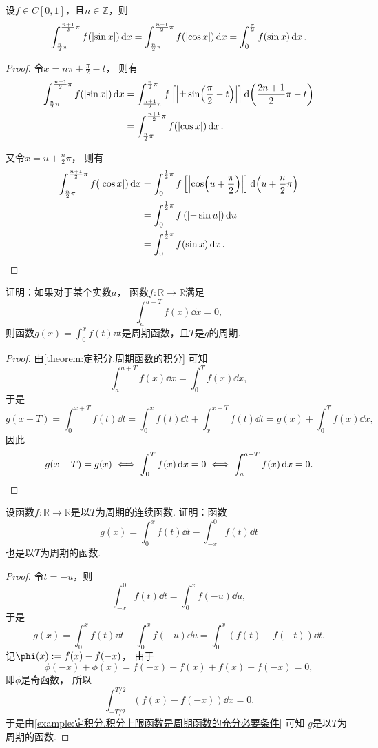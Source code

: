 \begin{proposition}\label{theorem:定积分.正余弦函数的复合的积分2}
设\(f \in C[0,1]\)，且\(n\in\mathbb{Z}\)，则\begin{equation}
	\int_{\frac{n}{2} \pi}^{\frac{n+1}{2} \pi} f(\abs{\sin x}) \dd{x}
	= \int_{\frac{n}{2} \pi}^{\frac{n+1}{2} \pi} f(\abs{\cos x}) \dd{x}
	= \int_0^{\frac{\pi}{2}} f(\sin x) \dd{x}.
\end{equation}
\def\arraystretch{1.5}
\begin{proof}
令\(x = n\pi+\frac{\pi}{2}-t\)，
则有\begin{align*}
	\int_{\frac{n}{2} \pi}^{\frac{n+1}{2} \pi} f(\abs{\sin x}) \dd{x}
	&= \int_{\frac{n+1}{2} \pi}^{\frac{n}{2} \pi} f\left[\abs{\pm\sin(\frac{\pi}{2}-t)}\right] \dd(\frac{2n+1}{2}\pi-t) \\
	&= \int_{\frac{n}{2} \pi}^{\frac{n+1}{2} \pi} f(\abs{\cos x}) \dd{x}.
\end{align*}

又令\(x=u+\frac{n}{2} \pi\)，
则有\begin{align*}
	\int_{\frac{n}{2} \pi}^{\frac{n+1}{2} \pi} f(\abs{\cos x}) \dd{x}
	&= \int_0^{\frac{1}{2}\pi} f\left[ \abs{\cos(u+\frac{\pi}{2})} \right] \dd(u+\frac{n}{2}\pi) \\
	&= \int_0^{\frac{1}{2}\pi} f\left( \abs{-\sin u} \right) \dd{u} \\
	&= \int_0^{\frac{1}{2}\pi} f(\sin x) \dd{x}.
	\qedhere
\end{align*}
\end{proof}
\end{proposition}

\begin{example}\label{example:定积分.积分上限函数是周期函数的充分必要条件}
证明：如果对于某个实数\(a\)，
函数\(f\colon\mathbb{R}\to\mathbb{R}\)满足\[
	\int_a^{a+T} f(x) \dd{x} = 0,
\]
则函数\(g(x) = \int_0^x f(t) \dd{t}\)是周期函数，且\(T\)是\(g\)的周期.
\begin{proof}
由\cref{theorem:定积分.周期函数的积分} 可知\[
	\int_a^{a+T} f(x) \dd{x} = \int_0^T f(x) \dd{x},
\]
于是\[
	g(x+T)
	= \int_0^{x+T} f(t) \dd{t}
	= \int_0^x f(t) \dd{t} + \int_x^{x+T} f(t) \dd{t}
	= g(x) + \int_0^T f(x) \dd{x},
\]
因此\[
	g(x+T) = g(x)
	\iff
	\int_0^T f(x) \dd{x} = 0
	\iff
	\int_a^{a+T} f(x) \dd{x} = 0.
	\qedhere
\]
\end{proof}
\end{example}
\begin{example}
设函数\(f\colon\mathbb{R}\to\mathbb{R}\)是以\(T\)为周期的连续函数.
证明：函数\[
	g(x) = \int_0^x f(t) \dd{t} - \int_{-x}^0 f(t) \dd{t}
\]也是以\(T\)为周期的函数.
\begin{proof}
令\(t=-u\)，则\[
	\int_{-x}^0 f(t) \dd{t}
	= \int_0^x f(-u) \dd{u},
\]
于是\[
	g(x) = \int_0^x f(t) \dd{t} - \int_0^x f(-u) \dd{u}
	= \int_0^x (f(t) - f(-t)) \dd{t}.
\]
记\(\phi(x) \defeq f(x) - f(-x)\)，
由于\[
	\phi(-x) + \phi(x)
	= f(-x) - f(x) + f(x) - f(-x)
	= 0,
\]
即\(\phi\)是奇函数，
所以\[
	\int_{-T/2}^{T/2} (f(x) - f(-x)) \dd{x}
	= 0.
\]
于是由\cref{example:定积分.积分上限函数是周期函数的充分必要条件} 可知
\(g\)是以\(T\)为周期的函数.
\end{proof}
\end{example}
